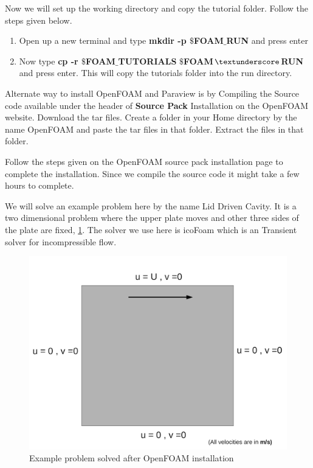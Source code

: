 \documentclass[a4paper,12pt]{report}
\begin{document}
\flushleft Now we will set up the working directory and copy the tutorial folder. Follow the steps given below. 
\begin{enumerate}
\item Open up a new terminal and type \textbf{mkdir -p $\$$FOAM$\_$RUN} and press enter
\item Now type \textbf{cp -r $\$$FOAM$\_$TUTORIALS} \textbf{$\$$FOAM$\textunderscore$RUN} and press enter. This will copy the tutorials folder into the run directory.
\end{enumerate}


\flushleft Alternate way to install OpenFOAM and Paraview is by Compiling the Source code available under the header of \textbf{Source Pack} Installation on the OpenFOAM website. Download the tar files. Create a folder in your Home directory by the name OpenFOAM and paste the tar files in that folder. Extract the files in that folder.

\flushleft Follow the steps given on the OpenFOAM source pack installation page to complete the installation. Since we compile the source code it might take a few hours to complete.

\flushleft We will solve an example problem here by the name Lid Driven Cavity. It is a two dimensional problem where the upper plate moves and other three sides of the plate are fixed, \ref{lid}. The solver we use here is icoFoam which is an Transient solver for incompressible flow.

\begin{figure}[ht]  
\begin{center}  
\includegraphics[scale=0.3]{liddrivencavity.pdf}
\caption{Example problem solved after OpenFOAM installation}
\label{lid}
\end{center}  
\end{figure}
\end{document}
